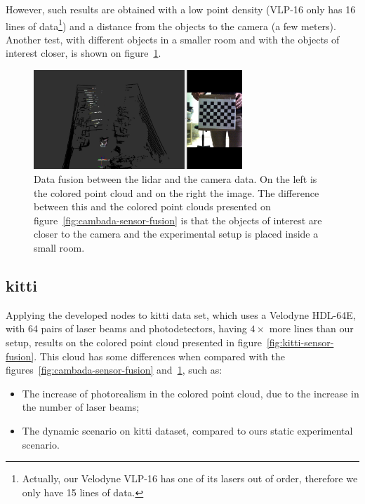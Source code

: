 However, such results are obtained with a low point density (VLP-16 only has 16 lines of data\footnote{Actually, our Velodyne VLP-16 has one of its lasers out of order, therefore we only have 15 lines of data.}) and a distance from the objects to the camera (a few meters). Another test, with different objects in a smaller room and with the objects of interest closer, is shown on figure~\ref{fig:dark-room-sensor-fusion}.

\begin{figure}[H]
	\centering
	\includegraphics[width=0.7\textwidth]{img/sensor_fusion/dark-room-sensor-fusion.png}
	\caption{Data fusion between the \ac{lidar} and the camera data. On the left is the colored point cloud and on the right the image. The difference between this and the colored point clouds presented on figure~\ref{fig:cambada-sensor-fusion} is that the objects of interest are closer to the camera and the experimental setup is placed inside a small room.}
	\label{fig:dark-room-sensor-fusion}
\end{figure}

\subsection{\ac{kitti}}
\label{subsec:sensor-fusion:kitti}
Applying the developed nodes to \ac{kitti} data set, which uses a Velodyne HDL-64E, with 64 pairs of laser beams and photodetectors, having $4\times$ more lines than our setup, results on the colored point cloud presented in figure~\ref{fig:kitti-sensor-fusion}. This cloud has some differences when compared with the figures~\ref{fig:cambada-sensor-fusion} and~\ref{fig:dark-room-sensor-fusion}, such as:

\begin{itemize}
	\item The increase of photorealism in the colored point cloud, due to the increase in the number of laser beams;
	\item The dynamic scenario on \ac{kitti} dataset, compared to ours static experimental scenario.
\end{itemize}

